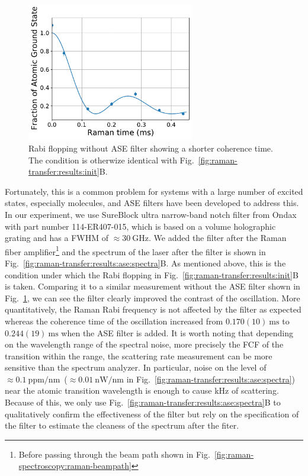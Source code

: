 \begin{figure}
  \centering
  \includegraphics[width=0.65\textwidth]{figures/raman_transfer_fit_zero_ase_time.pdf}
  \caption[Rabi flopping without ASE filter.]{
    Rabi flopping without ASE filter showing a shorter coherence time.
    The condition is otherwize identical with Fig.~\ref{fig:raman-transfer:results:init}B.
    \label{fig:raman-transfer:results:ase:zero}}
\end{figure}

Fortunately, this is a common problem for systems with a large number of excited states,
especially molecules, and ASE filters have been developed to address this.
In our experiment, we use SureBlock ultra narrow-band notch filter from Ondax
with part number 114-ER407-015,
which is based on a volume holographic grating and has a FWHM of $\approx\!30~\mathrm{GHz}$.
We added the filter after the Raman fiber amplifier\footnote{
  Before passing through the beam path shown in Fig.~\ref{fig:raman-spectroscopy:raman-beampath}
} and the spectrum of the laser after the filter is shown in
Fig.~\ref{fig:raman-transfer:results:ase:spectra}B.
As mentioned above, this is the condition under which the Rabi flopping
in Fig.~\ref{fig:raman-transfer:results:init}B is taken.
Comparing it to a similar measurement without the ASE filter shown in
Fig.~\ref{fig:raman-transfer:results:ase:zero},
we can see the filter clearly improved the contrast of the oscillation.
More quantitatively, the Raman Rabi frequency is not affected by the filter as expected
whereas the coherence time of the oscillation increased from $0.170(10)~\mathrm{ms}$
to $0.244(19)~\mathrm{ms}$ when the ASE filter is added.
It is worth noting that depending on the wavelength range of the spectral noise,
more precisely the FCF of the transition within the range,
the scattering rate measurement can be more sensitive than the spectrum analyzer.
In particular, noise on the level of
$\approx\!0.1~\mathrm{ppm/nm}$~($\approx\!0.01~\mathrm{nW/nm}$
in Fig.~\ref{fig:raman-transfer:results:ase:spectra}) near the atomic transition wavelength
is enough to cause kHz of scattering.
Because of this, we only use Fig.~\ref{fig:raman-transfer:results:ase:spectra}B
to qualitatively confirm the effectiveness of the filter
but rely on the specification of the filter
to estimate the cleaness of the spectrum after the fiter.

